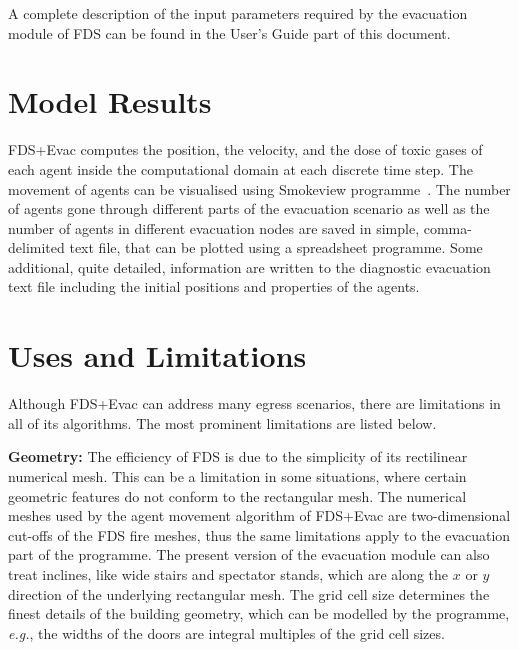 \documentclass[12pt,a4paper,final,twoside]{stylevk}
\begin{document}
A complete description of the input parameters required by the
evacuation module of FDS can be found in the User's Guide part of this
document.


\section{Model Results}

\noindent FDS+Evac computes the position, the velocity, and the dose
of toxic gases of each agent inside the computational domain at each
discrete time step.  The movement of agents can be visualised using
Smokeview programme~\cite{SV_UserGuide}.  The number of agents gone
through different parts of the evacuation scenario as well as the
number of agents in different evacuation nodes are saved in simple,
comma-delimited text file, that can be plotted using a spreadsheet
programme.  Some additional, quite detailed, information are written
to the diagnostic evacuation text file including the initial positions
and properties of the agents.


\section{Uses and Limitations}\label{Sec_UsesAndLimit}

\noindent Although FDS+Evac can address many egress scenarios, there
are limitations in all of its algorithms.  The most prominent
limitations are listed below.


\textbf{Geometry:} The efficiency of FDS is due to the simplicity
of its rectilinear numerical mesh.  This can be a limitation in some
situations, where certain geometric features do not conform to the
rectangular mesh.  The numerical meshes used by the agent movement
algorithm of FDS+Evac are two-dimensional cut-offs of the FDS fire
meshes, thus the same limitations apply to the evacuation part of the
programme.  The present version of the evacuation module can also
treat inclines, like wide stairs and spectator stands, which are along
the $x$ or $y$ direction of the underlying rectangular mesh.  The grid
cell size determines the finest details of the building geometry,
which can be modelled by the programme, \emph{e.g.}, the widths of the
doors are integral multiples of the grid cell sizes.
\end{document}
